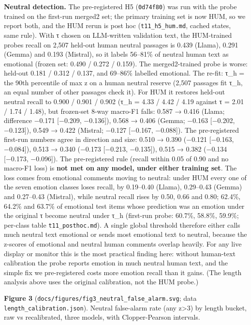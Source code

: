 \documentclass[
  10pt,
]{article}
\begin{document}
\textbf{Neutral detection.} The pre-registered H5 (\texttt{0d74f80}) was
run with the probe trained on the first-run merged2 set; the primary
training set is now HUM, so we report both, and the HUM rerun is post
hoc (\texttt{t11\_h5\_hum.md}, cached states, same rule). With τ chosen
on LLM-written validation text, the HUM-trained probe\textquotesingle s
recall on 2,507 held-out human neutral passages is 0.439 (Llama), 0.291
(Gemma) and 0.193 (Mistral), so it labels 56--81\% of neutral human text
as emotional (frozen set: 0.490 / 0.272 / 0.159). The merged2-trained
probe is worse: held-out 0.181 / 0.312 / 0.137, and 69--86\% labelled
emotional. The re-fit: τ\_h = the 90th percentile of max z on a human
neutral reserve (2,507 passages fit τ\_h, an equal number of other
passages check it). For HUM it restores held-out neutral recall to 0.900
/ 0.901 / 0.902 (τ\_h = 4.33 / 4.42 / 4.19 against τ = 2.01 / 1.74 /
1.48), but frozen-set 8-way macro-F1 falls: 0.587 → 0.416 (Llama;
difference −0.171 {[}−0.209, −0.136{]}), 0.568 → 0.406 (Gemma; −0.163
{[}−0.202, −0.123{]}), 0.549 → 0.422 (Mistral; −0.127 {[}−0.167,
−0.088{]}). The pre-registered first-run numbers agree in direction and
size: 0.510 → 0.390 (−0.121 {[}−0.163, −0.084{]}), 0.513 → 0.340 (−0.173
{[}−0.213, −0.135{]}), 0.515 → 0.382 (−0.134 {[}−0.173, −0.096{]}). The
pre-registered rule (recall within 0.05 of 0.90 and no macro-F1 loss) is
\textbf{not met on any model, under either training set}. The loss comes
from emotional comments moving to neutral: under HUM every one of the
seven emotion classes loses recall, by 0.19--0.40 (Llama), 0.29--0.43
(Gemma) and 0.27--0.43 (Mistral), while neutral recall rises by 0.50,
0.66 and 0.80; 62.4\%, 64.2\% and 63.7\% of emotional test items whose
prediction was an emotion under the original τ become neutral under τ\_h
(first-run probe: 60.7\%, 58.8\%, 59.9\%; per-class table
\texttt{t11\_posthoc.md}). A single global threshold therefore either
calls much neutral text emotional or sends most emotional text to
neutral, because the z-scores of emotional and neutral human comments
overlap heavily. For any live display or monitor this is the most
practical finding here: without human-text calibration the probe reports
emotion in much neutral human text, and the simple fix we pre-registered
costs more emotion recall than it gains. (The length analysis above uses
the original calibration, not the HUM probe.)

\textbf{Figure 3}
(\texttt{docs/figures/fig3\_neutral\_false\_alarm.svg}; data
\texttt{length\_calibration.json}). Neutral false-alarm rate (any
\textbar z\textbar\textgreater3) by length bucket, raw vs recalibrated,
three models, with Clopper-Pearson intervals.
\end{document}
